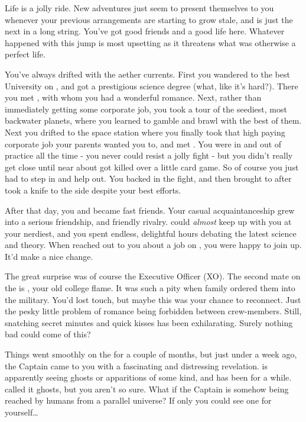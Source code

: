 \documentclass[char]{TMFHope}
\begin{document}
\name{\cSci{}}

Life is a jolly ride. New adventures just seem to present themselves to you whenever your previous arrangements are starting to grow stale, and \pNew{} is just the next in a long string. You've got good friends and a good life here. Whatever happened with this jump is most upsetting as it threatens what was otherwise a perfect life.

You've always drifted with the aether currents. First you wandered to the best University on \pHome{}, and got a prestigious science degree (what, like it's hard?). There you met \cXO{\full}, with whom you had a wonderful romance. Next, rather than immediately getting some corporate job, you took a tour of the seediest, most backwater \pEdge{} planets, where you learned to gamble and brawl with the best of them. Next you drifted to the space station where you finally took that high paying corporate job your parents wanted you to, and met \cMed{\full}. You were in and out of \cMed{\their} practice all the time - you never could resist a jolly fight - but you didn't really get close until \cCap{\full} near about got \cCap{\themself} killed over a little card game. So of course you just had to step in and help \cCap{\them} out. You backed \cCap{} in the fight, and then brought \cCap{\them} to \cMed{} after \cCap{\they} took a knife to the side despite your best efforts. 

After that day, you and \cMed{} became fast friends. Your casual acquaintanceship grew into a serious friendship, and friendly rivalry. \cMed{} could \emph{almost} keep up with you at your nerdiest, and you spent endless, delightful hours debating the latest science and theory. When \cCap{} reached out to you about a job on \pNew{}, you were happy to join up. It'd make a nice change.

The great surprise was of course the Executive Officer (XO). The second mate on the \pNew{} is \cXO{}, your old college flame. It was such a pity when \cXO{\their} family ordered them into the military. You'd lost touch, but maybe this was your chance to reconnect. Just the pesky little problem of romance being forbidden between crew-members. Still, snatching secret minutes and quick kisses has been exhilarating. Surely nothing bad could come of this?

Things went smoothly on the \pNew{} for a couple of months, but just under a week ago, the Captain came to you with a fascinating and distressing revelation. \cCap{} is apparently seeing ghosts or apparitions of some kind, and has been for a while. \cCap{\They} called it ghosts, but you aren't so sure. What if the Captain is somehow being reached by humans from a parallel universe? If only you could see one for yourself\ldots
\end{document}
